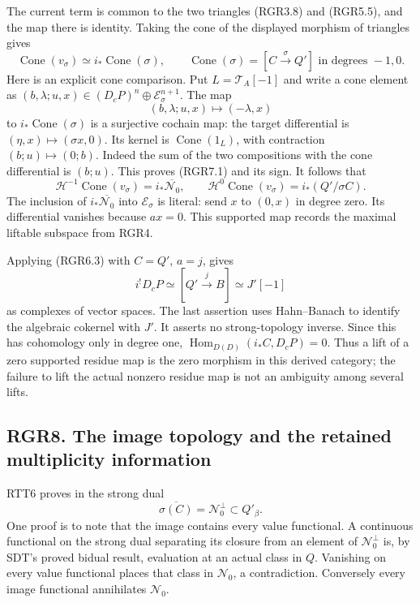 The current term is common to the two triangles (RGR3.8) and (RGR5.5),
and the map there is identity. Taking the cone of the displayed morphism
of triangles gives \[
 \operatorname{Cone}(v_\sigma)\simeq i_*\operatorname{Cone}(\sigma),
 \qquad \operatorname{Cone}(\sigma)=[C\xrightarrow\sigma Q']
 \text{ in degrees }-1,0.
 \tag{RGR7.1}
\] Here is an explicit cone comparison. Put \(L=\mathscr T_A[-1]\) and
write a cone element as
\((b,\lambda;u,x)\in(D_cP)^n\oplus\mathscr E_\sigma^{n+1}\). The map \[
 (b,\lambda;u,x)\longmapsto(-\lambda,x)
 \tag{RGR7.1a}
\] to \(i_*\operatorname{Cone}(\sigma)\) is a surjective cochain map:
the target differential is \((\eta,x)\mapsto(\sigma x,0)\). Its kernel
is \(\operatorname{Cone}(1_L)\), with contraction \((b;u)\mapsto(0;b)\).
Indeed the sum of the two compositions with the cone differential is
\((b;u)\). This proves (RGR7.1) and its sign. It follows that \[
 \mathcal H^{-1}\operatorname{Cone}(v_\sigma)
    =i_*\overline{\mathcal N_0},\qquad
 \mathcal H^0\operatorname{Cone}(v_\sigma)=i_*(Q'/\sigma C).
 \tag{RGR7.2}
\] The inclusion of \(i_*\overline{\mathcal N_0}\) into
\(\mathscr E_\sigma\) is literal: send \(x\) to \((0,x)\) in degree
zero. Its differential vanishes because \(a x=0\). This supported map
records the maximal liftable subspace from RGR4.

Applying (RGR6.3) with \(C=Q'\), \(a=j\), gives \[
 i^!D_cP\simeq[Q'\xrightarrow j B]\simeq J'[-1]
 \tag{RGR7.3}
\] as complexes of vector spaces. The last assertion uses Hahn--Banach
to identify the algebraic cokernel with \(J'\). It asserts no
strong-topology inverse. Since this has cohomology only in degree one,
\(\operatorname{Hom}_{D(D)}(i_*C,D_cP)=0\). Thus a lift of a zero
supported residue map is the zero morphism in this derived category; the
failure to lift the actual nonzero residue map is not an ambiguity among
several lifts.

\subsection{RGR8. The image topology and the retained multiplicity
information}\label{rgr8.-the-image-topology-and-the-retained-multiplicity-information}

RTT6 proves in the strong dual \[
 \overline{\sigma(C)}=\mathcal N_0^\perp\subset Q'_\beta.
 \tag{RGR8.1}
\] One proof is to note that the image contains every value functional.
A continuous functional on the strong dual separating its closure from
an element of \(\mathcal N_0^\perp\) is, by SDT's proved bidual result,
evaluation at an actual class in \(Q\). Vanishing on every value
functional places that class in \(\mathcal N_0\), a contradiction.
Conversely every image functional annihilates \(\mathcal N_0\).

